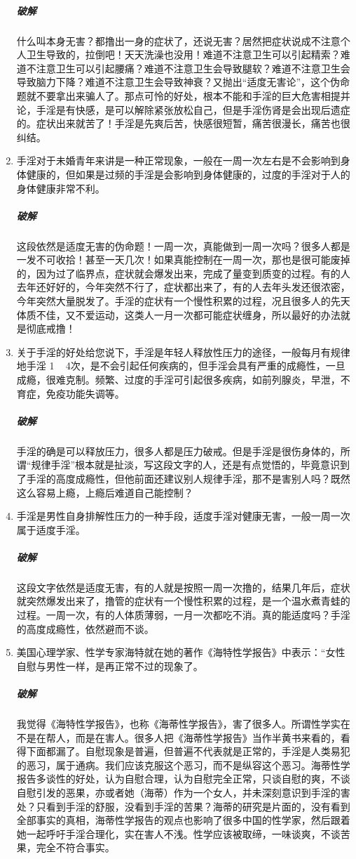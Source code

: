 \documentclass{ctexart}
\begin{document}
\begin{enumerate}
    \subparagraph{破解} 什么叫本身无害？都撸出一身的症状了，还说无害？居然把症状说成不注意个人卫生导致的，拉倒吧！天天洗澡也没用！难道不注意卫生可以引起精索？难道不注意卫生可以引起腰痛？难道不注意卫生会导致腿软？难道不注意卫生会导致脑力下降？难道不注意卫生会导致神衰？又抛出“适度无害论”，这个伪命题就不要拿出来骗人了。那点可怜的好处，根本不能和手淫的巨大危害相提并论，手淫是有快感，是可以解除紧张放松自己，但是手淫伤肾是会出现后遗症的。症状出来就苦了！手淫是先爽后苦，快感很短暂，痛苦很漫长，痛苦也很纠结。
    \item 手淫对于未婚青年来讲是一种正常现象，一般在一周一次左右是不会影响到身体健康的，但如果是过频的手淫是会影响到身体健康的，过度的手淫对于人的身体健康非常不利。
    \subparagraph{破解} 这段依然是适度无害的伪命题！一周一次，真能做到一周一次吗？很多人都是一发不可收拾！甚至一天几次！如果真能控制在一周一次，那也是很可能废掉的，因为过了临界点，症状就会爆发出来，完成了量变到质变的过程。有的人去年还好好的，今年突然不行了，症状都出来了，有的人去年头发还很浓密，今年突然大量脱发了。手淫的症状有一个慢性积累的过程，况且很多人的先天体质不佳，又不爱运动，这类人一月一次都可能症状缠身，所以最好的办法就是彻底戒撸！
    \item 关于手淫的好处给您说下，手淫是年轻人释放性压力的途径，一般每月有规律地手淫 1 ~ 4次，是不会引起任何疾病的，但手淫会具有严重的成瘾性，一旦成瘾，很难克制。频繁、过度的手淫可引起很多疾病，如前列腺炎，早泄，不育症，免疫功能失调等。
    \subparagraph{破解} 手淫的确是可以释放压力，很多人都是压力破戒。但是手淫是很伤身体的，所谓“规律手淫”根本就是扯淡，写这段文字的人，还是有点觉悟的，毕竟意识到了手淫的高度成瘾性，但他前面还建议别人规律手淫，那不是害别人吗？既然这么容易上瘾，上瘾后难道自己能控制？
    \item 手淫是男性自身排解性压力的一种手段，适度手淫对健康无害，一般一周一次属于适度手淫。
    \subparagraph{破解} 这段文字依然是适度无害，有的人就是按照一周一次撸的，结果几年后，症状就突然爆发出来了，撸管的症状有一个慢性积累的过程，是一个温水煮青蛙的过程。一周一次，有的人体质薄弱，一月一次都吃不消。真的能适度吗？手淫的高度成瘾性，依然避而不谈。
    \item 美国心理学家、性学专家海特就在她的著作《海特性学报告》中表示：“女性自慰与男性一样，是再正常不过的现象了。
    \subparagraph{破解} 我觉得《海特性学报告》，也称《海蒂性学报告》，害了很多人。所谓性学实在不是在帮人，而是在害人。很多人把《海蒂性学报告》当作半黄书来看的，看得下面都漏了。自慰现象是普遍，但普遍不代表就是正常的，手淫是人类易犯的恶习，属于通病。我们应该克服这个恶习，而不是纵容这个恶习。海蒂性学报告多谈性的好处，认为自慰合理，认为自慰完全正常，只谈自慰的爽，不谈自慰引发的恶果，亦或者她（海蒂）作为一个女人，并未深刻意识到手淫的害处？只看到手淫的舒服，没看到手淫的苦果？海蒂的研究是片面的，没有看到全部事实的真相，海蒂性学报告的观点也影响了很多中国的性学家，然后跟着她一起呼吁手淫合理化，实在害人不浅。性学应该被取缔，一味谈爽，不谈苦果，完全不符合事实。

\end{enumerate}
\end{document}
